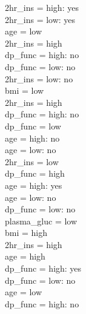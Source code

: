 \documentclass[12pt]{article}
\begin{document}
\textbar\quad \textbar\quad \textbar\quad \textbar\quad 2hr\_ins = high: yes\\
\textbar\quad \textbar\quad \textbar\quad \textbar\quad 2hr\_ins = low: yes\\
\textbar\quad \textbar\quad age = low\\
\textbar\quad \textbar\quad \textbar\quad 2hr\_ins = high\\
\textbar\quad \textbar\quad \textbar\quad \textbar\quad dp\_func = high: no\\
\textbar\quad \textbar\quad \textbar\quad \textbar\quad dp\_func = low: no\\
\textbar\quad \textbar\quad \textbar\quad 2hr\_ins = low: no\\
\textbar\quad bmi = low\\
\textbar\quad \textbar\quad 2hr\_ins = high\\
\textbar\quad \textbar\quad \textbar\quad dp\_func = high: no\\
\textbar\quad \textbar\quad \textbar\quad dp\_func = low\\
\textbar\quad \textbar\quad \textbar\quad \textbar\quad age = high: no\\
\textbar\quad \textbar\quad \textbar\quad \textbar\quad age = low: no\\
\textbar\quad \textbar\quad 2hr\_ins = low\\
\textbar\quad \textbar\quad \textbar\quad dp\_func = high\\
\textbar\quad \textbar\quad \textbar\quad \textbar\quad age = high: yes\\
\textbar\quad \textbar\quad \textbar\quad \textbar\quad age = low: no\\
\textbar\quad \textbar\quad \textbar\quad dp\_func = low: no\\
plasma\_gluc = low\\
\textbar\quad bmi = high\\
\textbar\quad \textbar\quad 2hr\_ins = high\\
\textbar\quad \textbar\quad \textbar\quad age = high\\
\textbar\quad \textbar\quad \textbar\quad \textbar\quad dp\_func = high: yes\\
\textbar\quad \textbar\quad \textbar\quad \textbar\quad dp\_func = low: no\\
\textbar\quad \textbar\quad \textbar\quad age = low\\
\textbar\quad \textbar\quad \textbar\quad \textbar\quad dp\_func = high: no\\
\end{document}
